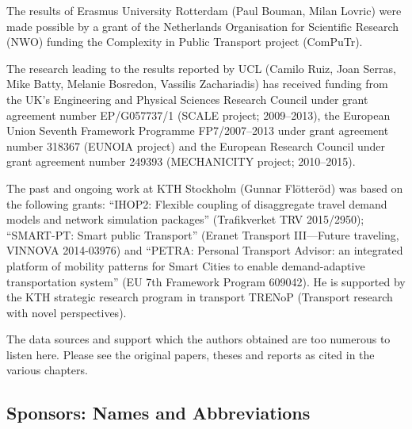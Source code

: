 The results of Erasmus University Rotterdam (Paul Bouman, Milan Lovric) were made possible by a grant of the Netherlands Organisation for Scientific Research (NWO) funding the Complexity in Public Transport project (ComPuTr). 

The research leading to the results reported by UCL (Camilo Ruiz, Joan Serras, Mike Batty, Melanie Bosredon, Vassilis Zachariadis) has received funding from the UK's Engineering and Physical Sciences Research Council under grant agreement number EP/G057737/1 (SCALE project; 2009–2013), the European Union Seventh Framework Programme FP7/2007–2013 under grant agreement number 318367 (EUNOIA project) and the European Research Council under grant agreement number 249393 (MECHANICITY project; 2010–2015).

The past and ongoing work at KTH Stockholm (Gunnar Flötteröd) was based on the
following grants:
``IHOP2: Flexible coupling of disaggregate travel demand models and network simulation packages'' (Trafikverket TRV 2015/2950); 
``SMART-PT: Smart public Transport'' (Eranet Transport III---Future traveling, VINNOVA 2014-03976) and
``PETRA: Personal Transport Advisor: an integrated platform of mobility patterns for Smart Cities to enable demand-adaptive transportation system'' (EU 7th Framework Program 609042). 
He is supported by the KTH strategic research program in transport TRENoP (Transport research with novel perspectives).

The data sources and support which the authors obtained are too numerous to listen here. Please see the original papers, theses and reports as cited in the various chapters. 

\subsection*{Sponsors: Names and Abbreviations}

